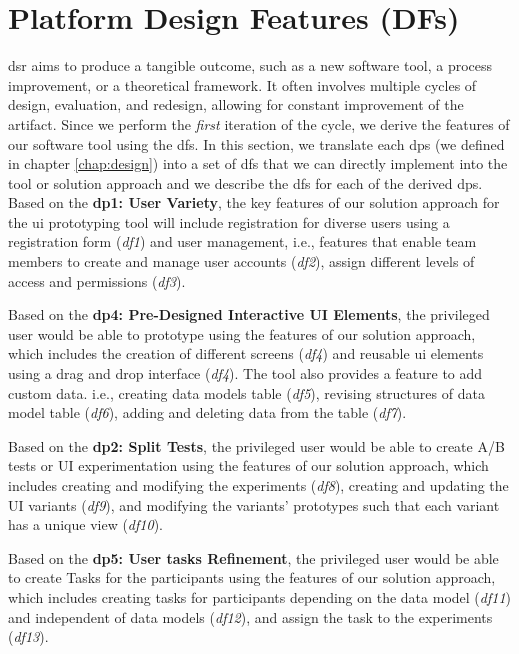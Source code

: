 \section{Platform Design Features (DFs)}
\label{implementation:section:designfeatures}
\ac{dsr} aims to produce a tangible outcome, such as a new software tool, a process improvement, or a theoretical framework.
It often involves multiple cycles of design, evaluation, and redesign, allowing for constant improvement of the artifact.
Since we perform the \textit{first} iteration of the cycle, we derive the features of our software tool using the \ac{df}s.
In this section, we translate each \ac{dp}s (we defined in chapter \ref{chap:design}) into a set of \ac{df}s that we can directly implement into the tool or solution approach and we describe the \ac{df}s for each of the derived \ac{dp}s.
\clearpage
Based on the \textbf{\ac{dp}1: User Variety}, the key features of our solution approach for the \ac{ui} prototyping tool will include registration for diverse users using a registration form (\textit{\ac{df}1}) and user management, i.e., features that enable team members to create and manage user accounts (\textit{\ac{df}2}), assign different levels of access and permissions (\textit{\ac{df}3}). 

Based on the \textbf{\ac{dp}4: Pre-Designed Interactive UI Elements}, the privileged user would be able to prototype using the features of our solution approach, which includes the creation of different screens (\textit{\ac{df}4}) and reusable \ac{ui} elements using a drag and drop interface (\textit{\ac{df}4}). The tool also provides a feature to add custom data. i.e., creating data models table (\textit{\ac{df}5}), revising structures of data model table (\textit{\ac{df}6}), adding and deleting data from the table (\textit{\ac{df}7}).

Based on the \textbf{\ac{dp}2: Split Tests}, the privileged user would be able to create A/B tests or UI experimentation using the features of our solution approach, which includes creating and modifying the experiments (\textit{\ac{df}8}), creating and updating the UI variants (\textit{\ac{df}9}), and modifying the variants' prototypes such that each variant has a unique view (\textit{\ac{df}10}). 

Based on the \textbf{\ac{dp}5: User tasks Refinement}, the privileged user would be able to create Tasks for the participants using the features of our solution approach, which includes creating tasks for participants depending on the data model (\textit{\ac{df}11}) and independent of data models (\textit{\ac{df}12}), and assign the task to the experiments (\textit{\ac{df}13}).

